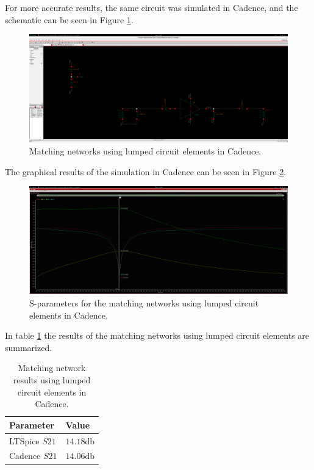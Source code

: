 For more accurate results, the same circuit was simulated in Cadence, and the schematic can be seen in Figure \ref{fig:CadenceLCMatchingCircuit}.
\begin{figure}[H]
    \centering
    \includegraphics[width=1\textwidth]{Images/CadenceLCcircuit.png}
    \caption{Matching networks using lumped circuit elements in Cadence.}
    \label{fig:CadenceLCMatchingCircuit}
\end{figure}

The graphical results of the simulation in Cadence can be seen in Figure \ref{fig:CadenceLC}.
\begin{figure}[H]
    \centering
    \includegraphics[width=1\textwidth]{Images/CAD-LC_matching.png}
    \caption{S-parameters for the matching networks using lumped circuit elements in Cadence.}
    \label{fig:CadenceLC}
\end{figure}

In table \ref{tab:LCMatchingParameters} the results of the matching networks using lumped circuit elements are summarized.

\begin{table}[H]
    \centering
    \caption{Matching network results using lumped circuit elements in Cadence.}
    \begin{tabularx}{\textwidth}{>{\centering\arraybackslash}X >{\centering\arraybackslash}X}
        \toprule
        \textbf{Parameter} & \textbf{Value} \\
        \midrule
        LTSpice $S21$  & $14.18 \si{\decibel}$ \\
        \midrule
        Cadence $S21$ & $14.06 \si{\decibel}$ \\
        \bottomrule
    \end{tabularx}
    \label{tab:LCMatchingParameters}
\end{table}

